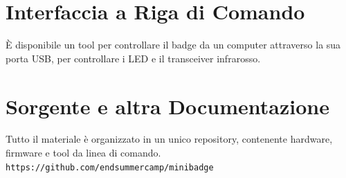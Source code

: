 \documentclass[10pt]{datasheet}
\begin{document}
\section{Interfaccia a Riga di Comando}
È disponibile un tool per controllare il badge da un computer attraverso la sua porta USB, per
controllare i LED e il transceiver infrarosso.
\vspace*{-5pt}
\section{Sorgente e altra Documentazione}
Tutto il materiale è organizzato in un unico repository, contenente hardware, firmware e tool da linea di comando.\\
\texttt{https://github.com/endsummercamp/minibadge}
	
\end{document}
